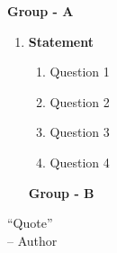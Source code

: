 \documentclass[12pt]{article}
\begin{document}
\begin{center}
\textbf{Group  - A}
\end{center}

  \begin{enumerate}
  
   \item
	  \textbf{Statement} 
  
  \begin{enumerate}
    \item
	Question \hfill 1
    \item
	Question \hfill 2
    \item  
	Question \hfill 3
    \item
	Question \hfill 4
  \end{enumerate}


\begin{center}
\textbf{Group  - B}
\end{center}
  
\end{enumerate}

 \vspace{2.5cm}

\begin{center}
 “Quote” \\ -- Author
\end{center}
\end{document}
